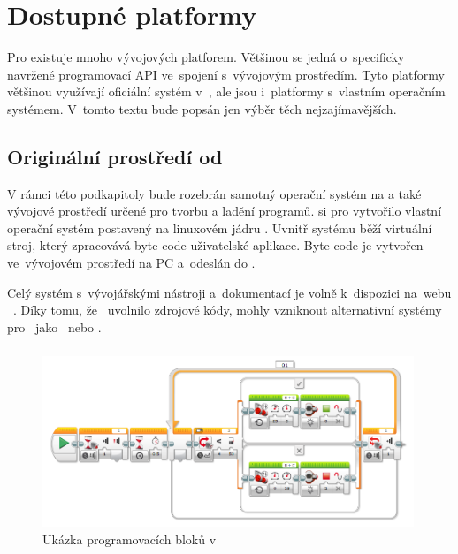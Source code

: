 \chapter{Dostupné platformy}

Pro \legoEV{} existuje mnoho vývojových platforem. 
Většinou se jedná o~specificky navržené programovací API ve~spojení s~vývojovým prostředím. 
Tyto platformy většinou využívají oficiální systém v~\EVthree{}, ale jsou i~platformy s~vlastním operačním systémem. 
V~tomto textu bude popsán jen výběr těch nejzajímavějších. %

\section{Originální prostředí od \lego}

V rámci této podkapitoly bude rozebrán samotný operační systém na \EVthree{} a také vývojové prostředí určené pro tvorbu a ladění programů. 
\lego{} si pro \EVthree{} vytvořilo vlastní operační systém postavený na linuxovém jádru \cite{legoMindstormsEV3_fw-dev-kit}. 
Uvnitř systému běží virtuální stroj, který zpracovává byte-code uživatelské aplikace. 
Byte-code je vytvořen ve~vývojovém prostředí na PC a~odeslán do . 

Celý systém s~vývojářskými nástroji a~dokumentací je volně k~dispozici na~webu \lego{}~\cite{legoMindstorms_download}. Díky tomu, že~\lego{} uvolnilo zdrojové kódy, mohly vzniknout alternativní systémy pro~\EVthree{} jako~\evThreeDev{} nebo \evRT. 

\subsection{\legoSW{}}
\begin{figure}[h]
	\centering
	\includegraphics[width=0.99\textwidth]{images/lego-soft/lego-soft_robotut_switch-touch+motors+leds.png}
	\caption{Ukázka programovacích bloků v \legoSW}
	\label{fig:lego-soft_example-blocks}
\end{figure}

